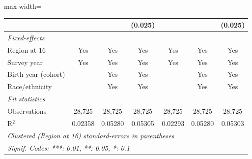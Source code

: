 \begin{adjustbox}{max width=\linewidth}
\begin{tabular}{lcccccc}
                                                         &               &               & (0.025)      &               &               & (0.025)\\   
      \midrule
      \emph{Fixed-effects}\\
      Region at 16                                       & Yes           & Yes           & Yes          & Yes           & Yes           & Yes\\  
      Survey year                                        & Yes           & Yes           & Yes          & Yes           & Yes           & Yes\\  
      Birth year (cohort)                                &               & Yes           & Yes          &               & Yes           & Yes\\  
      Race/ethnicity                                     &               & Yes           & Yes          &               & Yes           & Yes\\  
      \midrule
      \emph{Fit statistics}\\
      Observations                                       & 28,725        & 28,725        & 28,725       & 28,725        & 28,725        & 28,725\\  
      R$^2$                                              & 0.02358       & 0.05280       & 0.05305      & 0.02293       & 0.05280       & 0.05303\\  
      \midrule \midrule
      \multicolumn{7}{l}{\emph{Clustered (Region at 16) standard-errors in parentheses}}\\
      \multicolumn{7}{l}{\emph{Signif. Codes: ***: 0.01, **: 0.05, *: 0.1}}\\
   \end{tabular}
      \end{adjustbox}
\vspace{3pt}\par{}

